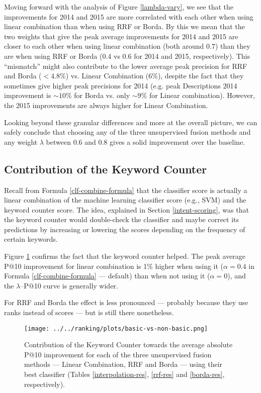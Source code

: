 Moving forward with the analysis of Figure \ref{lambda-vary}, we see that
the improvements for 2014 and 2015 are more correlated with each other when using linear combination than when using
RRF or Borda. By this we mean that the two weights that give the peak average improvements for 2014 and 2015 are closer to each other
when using linear combination (both around $0.7$) than they are when using RRF or Borda ($0.4$ vs $0.6$ for 2014 and 2015, respectively).
This ``mismatch'' might also contribute to the lower average peak precision for RRF and Borda ($<4.8\%$)
vs. Linear Combination ($6\%$), despite the fact that they sometimes
give higher peak precisions for 2014 (e.g. peak Descriptions 2014 improvement
is $\sim10\%$ for Borda vs. only $\sim9\%$ for Linear combination). However, the 2015 improvements are always higher for
Linear Combination.

Looking beyond these granular differences and more at the overall picture, we can safely conclude
that choosing any of the three unsupervised fusion methods and any weight $\lambda$ between 0.6 and 0.8 gives
a solid improvement over the baseline.

\subsection{Contribution of the Keyword Counter}
Recall from Formula \ref{clf-combine-formula} that the classifier score is actually
a linear combination of the machine learning classifier score (e.g., SVM) and the keyword counter score. The idea,
explained in Section \ref{intent-scoring},
was that the keyword counter would double-check the classifier and maybe correct its predictions by
increasing or lowering the scores depending on the frequency of certain keywords.

Figure \ref{basic-effect-plot}
confirms the fact that the keyword counter helped. The peak average P@10 improvement for linear combination is 1\% higher
when using it ($\alpha=0.4$ in Formula \ref{clf-combine-formula} --- default) than when not using it ($\alpha=0$), and the $\lambda$--P@10 curve is generally wider.

For RRF and Borda the effect is less pronounced --- probably because they use ranks instead of scores ---
but is still there nonetheless.

\begin{figure}[h!]
\centerline{
  \texttt{[image: ../../ranking/plots/basic-vs-non-basic.png]}
  }
  \caption{Contribution of the Keyword Counter towards the average absolute P@10 improvement for each of the three unsupervised
  fusion methods --- Linear Combination, RRF and Borda --- using their best classifier (Tables \ref{interpolation-res}, \ref{rrf-res}
and \ref{borda-res}, respectively).}
  \label{basic-effect-plot}
\end{figure}

